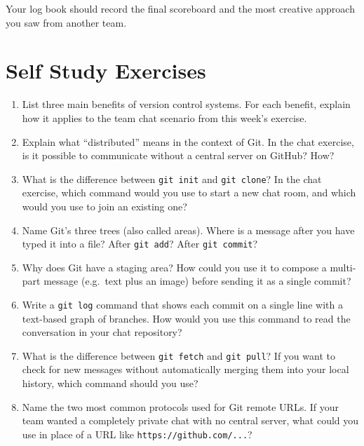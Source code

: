 \documentclass[twoside=false,DIV=14]{scrartcl}
\begin{document}
Your log book should record the final scoreboard and the most creative approach you saw from another team.

\section*{Self Study Exercises}
\begin{enumerate}
\item List three main benefits of version control systems.  For each benefit, explain how it applies to the team chat scenario from this week's exercise.

\item Explain what ``distributed'' means in the context of Git.  In the chat exercise, is it possible to communicate without a central server on GitHub?  How?

\item What is the difference between \texttt{git init} and \texttt{git clone}?  In the chat exercise, which command would you use to start a new chat room, and which would you use to join an existing one?

\item Name Git's three trees (also called areas).  Where is a message after you have typed it into a file?  After \texttt{git add}?  After \texttt{git commit}?

\item Why does Git have a staging area?  How could you use it to compose a multi-part message (e.g.\ text plus an image) before sending it as a single commit?

\item Write a \texttt{git log} command that shows each commit on a single line with a text-based graph of branches.  How would you use this command to read the conversation in your chat repository?

\item What is the difference between \texttt{git fetch} and \texttt{git pull}?  If you want to check for new messages without automatically merging them into your local history, which command should you use?

\item Name the two most common protocols used for Git remote URLs.  If your team wanted a completely private chat with no central server, what could you use in place of a URL like \texttt{https://github.com/...}?
\end{enumerate}
\end{document}
